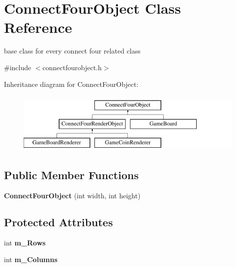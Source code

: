 \hypertarget{classConnectFourObject}{\section{\-Connect\-Four\-Object \-Class \-Reference}
\label{classConnectFourObject}
}


base class for every connect four related class  




{\ttfamily \#include $<$connectfourobject.\-h$>$}

\-Inheritance diagram for \-Connect\-Four\-Object\-:\begin{figure}[H]
\begin{center}
\leavevmode
\includegraphics[height=3.000000cm]{classConnectFourObject}
\end{center}
\end{figure}
\subsection*{\-Public \-Member \-Functions}
\begin{DoxyCompactItemize}
\item 
\hypertarget{classConnectFourObject_a6dabab64cdbd0b264aebf42435dd901b}{{\bfseries \-Connect\-Four\-Object} (int width, int height)}\label{classConnectFourObject_a6dabab64cdbd0b264aebf42435dd901b}

\end{DoxyCompactItemize}
\subsection*{\-Protected \-Attributes}
\begin{DoxyCompactItemize}
\item 
\hypertarget{classConnectFourObject_ae6e240f90182a3ff58790a1307ccd1b1}{int {\bfseries m\-\_\-\-Rows}}\label{classConnectFourObject_ae6e240f90182a3ff58790a1307ccd1b1}

\item 
\hypertarget{classConnectFourObject_a6a2622a917669b269f88af84f25425eb}{int {\bfseries m\-\_\-\-Columns}}\label{classConnectFourObject_a6a2622a917669b269f88af84f25425eb}

\end{DoxyCompactItemize}



